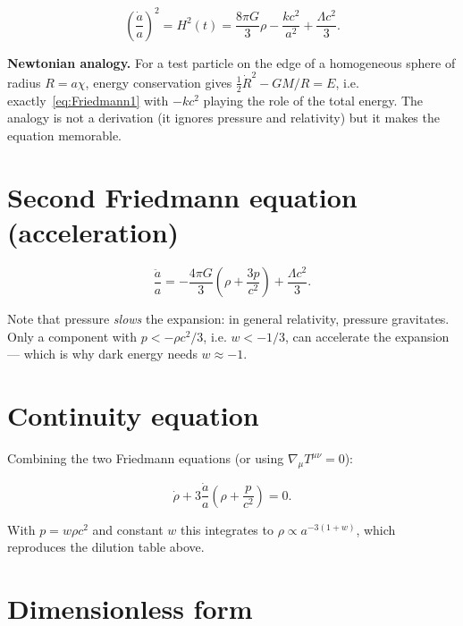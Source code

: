 \documentclass[11pt,a4paper,openany]{report}
\begin{document}
\begin{equation}
\boxed{\;\left(\frac{\dot a}{a}\right)^{2} = H^{2}(t)
 = \frac{8\pi G}{3}\rho - \frac{k c^{2}}{a^{2}} + \frac{\Lambda c^{2}}{3}.\;}
\label{eq:Friedmann1}
\end{equation}

\begin{tcolorbox}[undergrad]
\textbf{Newtonian analogy.} For a test particle on the edge of a homogeneous
sphere of radius $R = a\chi$, energy conservation gives
$\tfrac12\dot R^{2} - GM/R = E$, i.e. exactly~\eqref{eq:Friedmann1} with
$-kc^2$ playing the role of the total energy. The analogy is not a derivation
(it ignores pressure and relativity) but it makes the equation memorable.
\end{tcolorbox}

\section{Second Friedmann equation (acceleration)}

\begin{equation}
\frac{\ddot a}{a} = -\frac{4\pi G}{3}\left(\rho + \frac{3p}{c^{2}}\right)
 + \frac{\Lambda c^{2}}{3}.
\label{eq:Friedmann2}
\end{equation}

\noindent Note that pressure \emph{slows} the expansion: in general relativity,
pressure gravitates. Only a component with $p < -\rho c^{2}/3$, i.e. $w<-1/3$,
can accelerate the expansion --- which is why dark energy needs $w \approx -1$.

\section{Continuity equation}

Combining the two Friedmann equations (or using $\nabla_\mu T^{\mu\nu}=0$):

\begin{equation}
\dot\rho + 3\frac{\dot a}{a}\left(\rho + \frac{p}{c^{2}}\right) = 0 .
\label{eq:continuity}
\end{equation}

\noindent With $p = w\rho c^{2}$ and constant $w$ this integrates to
$\rho \propto a^{-3(1+w)}$, which reproduces the dilution table above.

\section{Dimensionless form}
\end{document}
